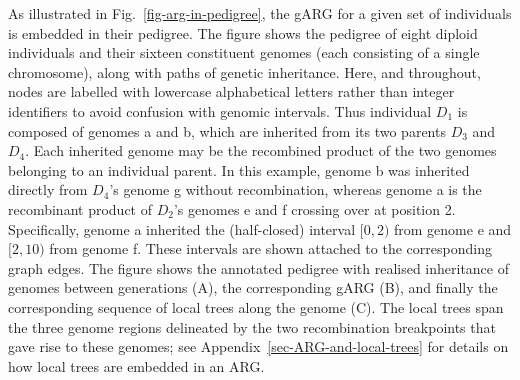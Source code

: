 \documentclass[9pt,twocolumn,twoside]{gsajnl}
\newcommand{\noderef}[1]{\textsf{#1}}
\begin{document}
As illustrated in Fig.~\ref{fig-arg-in-pedigree},
the gARG for a given set of individuals is embedded in their pedigree.
The figure shows the pedigree of eight diploid individuals
and their sixteen constituent genomes (each consisting of a single chromosome),
along with paths of genetic inheritance.
Here, and throughout,
nodes are labelled with lowercase alphabetical letters
rather than integer identifiers to avoid confusion with genomic intervals.
Thus individual $D_1$ is composed
of genomes \noderef{a} and \noderef{b}, which are inherited from its
two parents $D_3$ and $D_4$. Each inherited genome may be the recombined product
of the two genomes belonging to an individual parent.
In this example,
genome \noderef{b} was inherited directly from $D_4$'s genome \noderef{g} without
recombination, whereas
genome \noderef{a} is the recombinant product of
$D_2$'s genomes \noderef{e} and \noderef{f} crossing over at position 2.
Specifically, genome \noderef{a} inherited the (half-closed)
interval $[0, 2)$ from genome \noderef{e} and $[2, 10)$ from genome \noderef{f}.
These intervals are shown attached to the corresponding graph edges.
The figure shows the annotated pedigree with realised inheritance of genomes
between generations (A), the corresponding gARG (B), and finally the corresponding
sequence of local trees along the
genome (C).
The local trees span the three genome regions delineated
by the two recombination breakpoints that gave rise to these genomes;
see Appendix~\ref{sec-ARG-and-local-trees} for details
on how local trees are embedded in an ARG.

\end{document}
